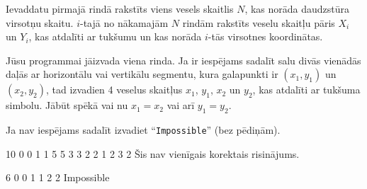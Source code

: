 \documentclass{boi2014-lv}
\newcommand{\constant}[1]{{\tt #1}}
\begin{document}
    \Input
		
		Ievaddatu pirmajā rindā rakstīts viens vesels skaitlis $N$, kas norāda daudzstūra virsotņu skaitu. $i$-tajā no nākamajām $N$ rindām rakstīts veselu skaitļu pāris $X_i$ un $Y_i$, kas atdalīti ar tukšumu un kas norāda $i$-tās virsotnes koordinātas.

	\Output
	
		Jūsu programmai jāizvada viena rinda. Ja ir iespējams sadalīt salu divās vienādās daļās ar horizontālu vai vertikālu segmentu, kura galapunkti ir $(x_1, y_1)$ un $(x_2, y_2)$, tad izvadien 4 veselus skaitļus $x_1$, $y_1$, $x_2$ un $y_2$, kas atdalīti ar tukšuma simbolu. Jābūt spēkā vai nu $x_1 = x_2$ vai arī $y_1 = y_2$.

	Ja nav iespējams sadalīt izvadiet	``\constant{Impossible}'' (bez pēdiņām).

    \Examples
	\example
	{
		10  0  0  1  1  5  5  3  3  2  2
	}
	{
		1 2 3 2
	}
	{
		Šis nav vienīgais korektais risinājums.
	}

	\example
	{
		6  0  0  1  1  2  2
	}
	{
		Impossible
	}
\end{document}
